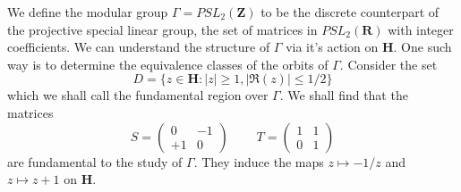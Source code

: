 We define the modular group $\Gamma = PSL_2(\mathbf{Z})$ to be the discrete counterpart of the projective special linear group, the set of matrices in $PSL_2(\mathbf{R})$ with integer coefficients. We can understand the structure of $\Gamma$ via it's action on $\mathbf{H}$. One such way is to determine the equivalence classes of the orbits of $\Gamma$. Consider the set
%
\[ D = \{ z \in \mathbf{H} : |z| \geq 1, |\Re(z)| \leq 1/2 \} \]
%
which we shall call the fundamental region over $\Gamma$. We shall find that the matrices
%
\[ S = \begin{pmatrix} 0 & -1 \\ +1 & 0 \end{pmatrix}\ \ \ \ \ \ \ \ \ \ T = \begin{pmatrix} 1 & 1 \\ 0 & 1 \end{pmatrix} \]
%
are fundamental to the study of $\Gamma$. They induce the maps $z \mapsto -1/z$ and $z \mapsto z + 1$ on $\mathbf{H}$.

